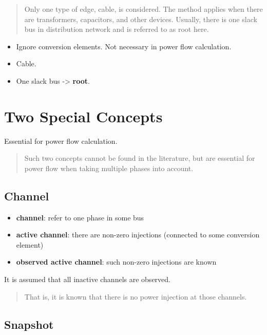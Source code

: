 \documentclass[
]{book}
\providecommand{\tightlist}{%
  \setlength{\itemsep}{0pt}\setlength{\parskip}{0pt}}
\begin{document}
\begin{quote}
Only one type of edge, cable, is considered. The method applies when there
are transformers, capacitors, and other devices. Usually, there is one slack
bus in distribution network and is referred to as root here.
\end{quote}

\begin{itemize}
\tightlist
\item
  Ignore conversion elements. Not necessary in power flow calculation.
\item
  Cable.
\item
  One slack bus -\textgreater{} \textbf{root}.
\end{itemize}

\hypertarget{concepts}{%
\section{Two Special Concepts}\label{concepts}}

Essential for power flow calculation.

\begin{quote}
Such two concepts cannot be found in the literature, but are essential for
power flow when taking multiple phases into account.
\end{quote}

\hypertarget{channel}{%
\subsection*{Channel}\label{channel}}

\begin{itemize}
\tightlist
\item
  \textbf{channel}: refer to one phase in some bus
\item
  \textbf{active channel}: there are non-zero injections (connected to some
  conversion element)
\item
  \textbf{observed active channel}: such non-zero injections are known
\end{itemize}

It is assumed that all inactive channels are observed.

\begin{quote}
That is, it is known that there is no power injection at those channels.
\end{quote}

\hypertarget{snapshot}{%
\subsection*{Snapshot}\label{snapshot}}
\end{document}
